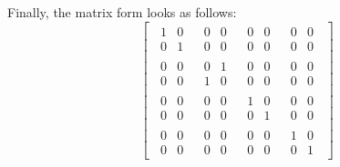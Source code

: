 \documentclass[fleqn,a4paper]{article}
\theoremstyle{definition}
\theoremstyle{definition}
\theoremstyle{definition}
\theoremstyle{definition}
\theoremstyle{remark}
\begin{document}
Finally, the matrix form looks as follows:
\[
  \left[
  \,
    \begin{array}{c|c|c|c}
      \begin{matrix}1&0\\0&1\end{matrix}
      & \begin{matrix}0&0\\0&0\end{matrix}
      & \begin{matrix}0&0\\0&0\end{matrix}
      & \begin{matrix}0&0\\0&0\end{matrix}
    \\\hline
    \begin{matrix}0&0\\0&0\end{matrix}
      & \begin{matrix}0&1\\1&0\end{matrix}
      & \begin{matrix}0&0\\0&0\end{matrix}
      & \begin{matrix}0&0\\0&0\end{matrix}
    \\\hline
    \begin{matrix}0&0\\0&0\end{matrix}
      & \begin{matrix}0&0\\0&0\end{matrix}
      & \begin{matrix}1&0\\0&1\end{matrix}
      & \begin{matrix}0&0\\0&0\end{matrix}
    \\\hline
    \begin{matrix}0&0\\0&0\end{matrix}
      & \begin{matrix}0&0\\0&0\end{matrix}
      & \begin{matrix}0&0\\0&0\end{matrix}
      & \begin{matrix}1&0\\0&1\end{matrix}
    \end{array}
  \,
  \right]
\]
\end{document}

